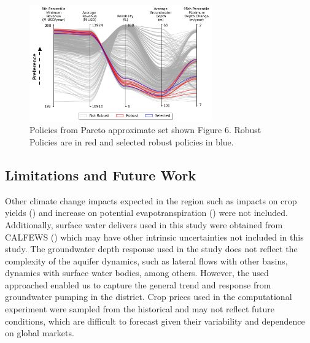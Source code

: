 \documentclass[11pt,a4paper]{article}
\begin{document}
\begin{figure}[H]
    \centering
    \includegraphics[width=0.7\textwidth]{robust_policies_parallel_axis.png}
    \caption{Policies from Pareto approximate set shown Figure 6. Robust Policies are in red and selected robust policies in blue.} \label{fig:parallel_robustness}
\end{figure}

\subsection{Limitations and Future Work}

Other climate change impacts expected in the region such as impacts on crop yields (\cite{blanc_is_2017}) and increase on potential evapotranspiration (\cite{vahmani_will_2022,mcevoy_projected_2020}) were not included. Additionally, surface water delivers used in this study were obtained from CALFEWS (\cite{zeff_californias_2021}) which may have other intrinsic uncertainties not included in this study. The groundwater depth response used in the study does not reflect the complexity of the aquifer dynamics, such as lateral flows with other basins, dynamics with surface water bodies, among others. However, the used approached enabled us to capture the general trend and response from groundwater pumping in the district. Crop prices used in the computational experiment were sampled from the historical and may not reflect future conditions, which are difficult to forecast given their variability and dependence on global markets. 
\end{document}
